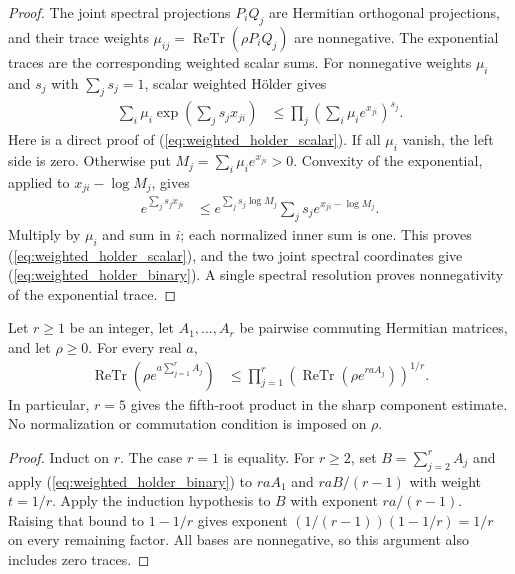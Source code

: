\begin{proof}
\leanok
The joint spectral projections $P_iQ_j$ are Hermitian orthogonal projections,
and their trace weights $\mu_{ij}=\operatorname{ReTr}(\rho P_iQ_j)$ are nonnegative.
The exponential traces are the corresponding weighted scalar sums.
For nonnegative weights $\mu_i$ and $s_j$ with $\sum_j s_j=1$, scalar weighted
H\"older gives
\begin{align}
 \sum_i\mu_i\exp\!\left(\sum_j s_jx_{ji}\right)
 &\le\prod_j\left(\sum_i\mu_i e^{x_{ji}}\right)^{s_j}.
 \label{eq:weighted_holder_scalar}
\end{align}
Here is a direct proof of (\ref{eq:weighted_holder_scalar}). If all $\mu_i$ vanish,
the left side is zero. Otherwise put $M_j=\sum_i\mu_i e^{x_{ji}}>0$.
Convexity of the exponential, applied to $x_{ji}-\log M_j$, gives
\begin{align}
 e^{\sum_j s_jx_{ji}}
 &\le e^{\sum_j s_j\log M_j}\sum_j s_j e^{x_{ji}-\log M_j}.
\end{align}
Multiply by $\mu_i$ and sum in $i$; each normalized inner sum is one.
This proves (\ref{eq:weighted_holder_scalar}), and the two joint spectral
coordinates give (\ref{eq:weighted_holder_binary}). A single spectral
resolution proves nonnegativity of the exponential trace.
\end{proof}

\begin{theorem}
\label{thm:weighted-trace-holder-finite}
\leanok
Let $r\ge1$ be an integer, let $A_1,\ldots,A_r$ be pairwise commuting
Hermitian matrices, and let $\rho\ge0$. For every real $a$,
\begin{align}
 \operatorname{ReTr}\left(\rho e^{a\sum_{j=1}^r A_j}\right)
 &\le\prod_{j=1}^r
       \left(\operatorname{ReTr}(\rho e^{raA_j})\right)^{1/r}.
 \label{eq:weighted_holder_finite}
\end{align}
In particular, $r=5$ gives the fifth-root product in the sharp component
estimate. No normalization or commutation condition is imposed on $\rho$.
\end{theorem}

\begin{proof}
\leanok
Induct on $r$. The case $r=1$ is equality. For $r\ge2$, set
$B=\sum_{j=2}^r A_j$ and apply (\ref{eq:weighted_holder_binary}) to
$raA_1$ and $raB/(r-1)$ with weight $t=1/r$. Apply the induction hypothesis
to $B$ with exponent $ra/(r-1)$. Raising that bound to $1-1/r$ gives
exponent $(1/(r-1))(1-1/r)=1/r$ on every remaining factor.
All bases are nonnegative, so this argument also includes zero traces.
\end{proof}
